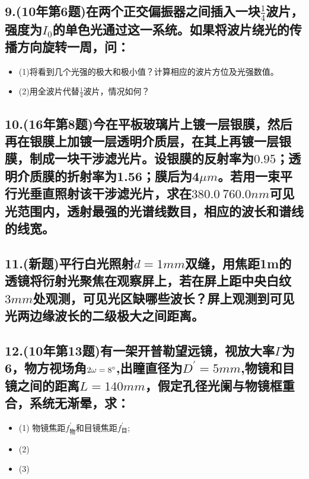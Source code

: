 \documentclass[11pt,a4paper]{article}
\begin{document}
    \subsection*{9.(10年第6题)在两个正交偏振器之间插入一块$\frac{1}{4}$波片，强度为$I_0$的单色光通过这一系统。如果将波片绕光的传播方向旋转一周，问：}
    \begin{itemize}
        \vspace{-3mm}
        \item (1)将看到几个光强的极大和极小值？计算相应的波片方位及光强数值。
        \vspace{-3mm}
        \item (2)用全波片代替$\frac{1}{4}$波片，情况如何？
    \end{itemize}
    \vspace{15mm}
    \subsection*{10.(16年第8题)今在平板玻璃片上镀一层银膜，然后再在银膜上加镀一层透明介质层，在其上再镀一层银膜，制成一块干涉滤光片。设银膜的反射率为$0.95$；透明介质膜的折射率为1.56；膜后为4$\mu m$。若用一束平行光垂直照射该干涉滤光片，求在$380.0~760.0nm$可见光范围内，透射最强的光谱线数目，相应的波长和谱线的线宽。}
    \vspace{15mm}
    \subsection*{11.(新题)平行白光照射$d=1mm$双缝，用焦距1m的透镜将衍射光聚焦在观察屏上，若在屏上距中央白纹$3mm$处观测，可见光区缺哪些波长？屏上观测到可见光两边缘波长的二级极大之间距离。}
    \vspace{15mm}
    \subsection*{12.(10年第13题)有一架开普勒望远镜，视放大率$\Gamma $为6，物方视场角$2\omega =8\degree$,出瞳直径为$D^{'}=5mm$,物镜和目镜之间的距离$L=140mm$，假定孔径光阑与物镜框重合，系统无渐晕，求：}
    \begin{itemize}
        \vspace{-3mm}
        \item (1) 物镜焦距$f_{物}^{'}$和目镜焦距$f_{目}^{'}$;
        \vspace{-3mm}
        \item (2)
        \vspace{-3mm}
        \item (3)
    \end{itemize}
\end{document}
